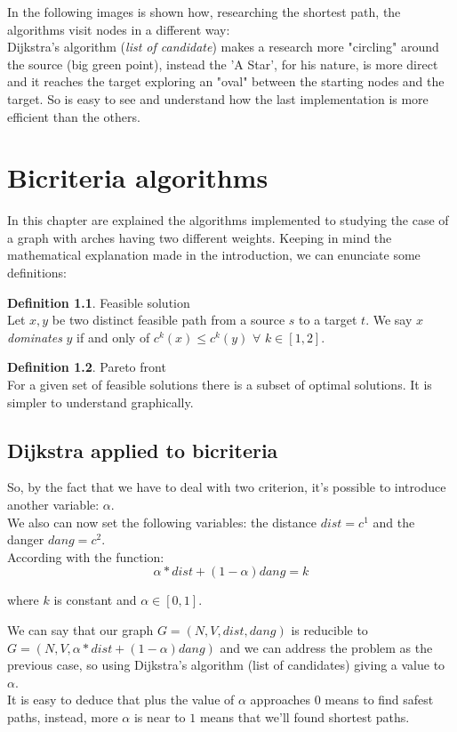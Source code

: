 \documentclass[a4paper,12pt]{report}
\begin{document}
In the following images is shown how, researching the shortest path, the algorithms visit nodes in a different way:\\
Dijkstra's algorithm (\textit{list of candidate}) makes a research more "circling" around the source (big green point), instead the 'A Star', for his nature, is more direct and it reaches the target exploring an "oval" between the starting nodes and the target. So is easy to see and understand how the last implementation is more efficient than the others.  

\chapter{Bicriteria algorithms}

In this chapter are explained the algorithms implemented to studying the case of a graph with arches having two different weights.
Keeping in mind the mathematical explanation made in the introduction, we can enunciate some definitions:

\theoremstyle{definition}
\newtheorem{definition}{Definition}
\begin{definition}{Feasible solution}\\
	Let $x, y$ be two distinct feasible path from a source $s$ to a target $t$. We say $x$ \emph{dominates} $y$ if and only of $c^k(x) \leq c^k(y)$ $\forall$ $k \in [1,2]$.
\end{definition}

\theoremstyle{definition}
\begin{definition}{Pareto front}\\
	For a given set of feasible solutions there is a subset of optimal solutions. It is simpler to understand graphically.
\end{definition}

\section{Dijkstra applied to bicriteria}
So, by the fact that we have to deal with two criterion, it's possible to introduce another variable: $\alpha$.\\
We also can now set the following variables: the distance $dist=c^1$ and the danger $dang=c^2$.\\
According with the function: 
\begin{equation}\label{eq:pareto front}
	\alpha*dist + (1-\alpha) dang = k
\end{equation}
\begin{center}
	where $k$ is constant and $\alpha \in [0, 1]$.
\end{center}
We can say that our graph $G=(N,V,dist,dang)$ is reducible to $G=(N,V,\alpha*dist + (1-\alpha) dang)$ and we can address the problem as the previous case, so using Dijkstra's algorithm (list of candidates) giving a value to $\alpha$.\\
It is easy to deduce that plus the value of $\alpha$ approaches $0$ means to find safest paths, instead, more $\alpha$ is near to $1$ means that we'll found shortest paths.
\end{document}
